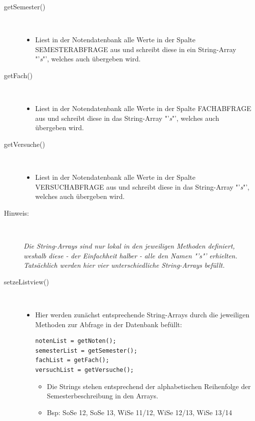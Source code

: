 \begin{description}
 
\item[getSemester()]~\par
\begin{itemize}
\item Liest in der Notendatenbank alle Werte in der Spalte \textcolor{lila}{SEMESTERABFRAGE} aus und schreibt diese in ein String-Array "'\textit{s}"', welches auch übergeben wird. 
\end{itemize} 
\item[getFach()]~\par
\begin{itemize}
\item Liest in der Notendatenbank alle Werte in der Spalte \textcolor{lila}{FACHABFRAGE} aus und schreibt diese in das String-Array "'\textit{s}"', welches auch übergeben wird.
\end{itemize}

\item[getVersuche()]~\par
\begin{itemize}
\item Liest in der Notendatenbank alle Werte in der Spalte \textcolor{lila}{VERSUCHABFRAGE} aus und schreibt diese in das String-Array "'\textit{s}"', welches auch übergeben wird.
\end{itemize}
\item[Hinweis:]~\par \textit{Die String-Arrays sind nur lokal in den jeweiligen Methoden definiert, weshalb diese - der Einfachheit halber - alle den Namen "'\textit{s}"' erhielten. Tatsächlich werden hier vier unterschiedliche String-Arrays befüllt.}
 
\item[setzeListview()]~\par
\begin{itemize}
\item Hier werden zunächst entsprechende String-Arrays durch die jeweiligen Methoden zur Abfrage in der Datenbank befüllt:
\begin{lstlisting}
notenList = getNoten();
semesterList = getSemester();
fachList = getFach();
versuchList = getVersuche();
\end{lstlisting}
\begin{itemize}
\item Die Strings stehen entsprechend der alphabetischen Reihenfolge der Semesterbeschreibung in den Arrays.
\item Bsp: SoSe 12, SoSe 13, WiSe 11/12, WiSe 12/13, WiSe 13/14
\end{itemize}


\end{itemize}
\end{description}
